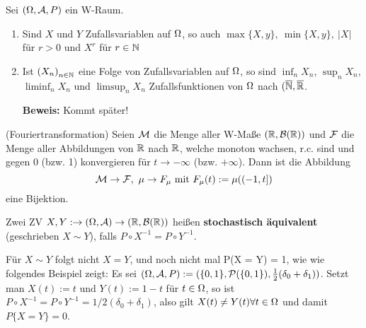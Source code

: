 \documentclass[parskip = full, 12pt]{scrartcl}
\begin{document}
\label{ss: Satz 4.3}
	Sei $(\Omega, \mathcal{A}, P)$ ein W-Raum.
	\begin{enumerate}
		\item Sind $X$ und $Y$ Zufallsvariablen auf $\Omega$, so auch $\max\{ X, y \},\
			\min\{ X, y \},\ |X|$ für $r > 0$ und $X^r$ für $r \in \mathbb{N}$	
		\item Ist ${(X_n)}_{n \in \mathbb{N}}$ eine Folge von Zufallsvariablen auf $\Omega$, 
			so sind $\inf_n X_n$, $\sup_n X_n$, $\liminf_n X_n$ und $\limsup_n X_n$ 
			Zufallsfunktionen von $ \Omega$ nach $(\overline{\mathbb{N}}, \overline{\mathbb{R}}$.

			\textbf{Beweis:} Kommt später!
	\end{enumerate}

\label{ss: Satz 4.4}
	(Fouriertransformation) Seien $\mathcal{M}$ die Menge aller W-Maße $(\mathbb{R}, \mathcal{B}(
	\mathbb{R}))$ und $\mathcal{F}$ die Menge aller Abbildungen von $\mathbb{R}$ nach $\mathbb{R}$,
	welche monoton wachsen, r.c. sind und gegen 0 (bzw. 1) konvergieren für $t 
	\rightarrow -\infty$ (bzw. $+ \infty$). Dann ist die Abbildung
	$$ \mathcal{M} \rightarrow \mathcal{F},\ \mu \rightarrow F_\mu \textrm{ mit } F_\mu(t) := 
	\mu( (-1,t])$$ eine Bijektion.

\label{ss: Defintion 4.5}
	Zwei ZV $X,Y: \rightarrow (\Omega, \mathcal{A}) \rightarrow (\mathbb{R}, \mathcal{B}(\mathbb{R}))$ heißen 
	\textbf{stochastisch äquivalent} (geschrieben $X \sim Y$), falls $P \circ 
	X^{-1} = P \circ Y^{-1}$.

\label{ss: Beispiel 4.6}
	Für $X \sim Y$ folgt nicht $X = Y$, und noch nicht mal P({X = Y}) = 1, wie 
	wie folgendes Beispiel zeigt: Es sei $(\Omega, \mathcal{A}, P) := (\{ 0,1 \}, \mathcal{P}(\{ 0,1
	\}), \frac{1}{2}(\delta_0 + \delta_1))$. Setzt man $X(t) := t$ und $Y(t) := 
	1 - t$ für $t \in \Omega$, so ist $P \circ X^{-1} = P \circ Y^{-1} = 1/2(\delta_0
	+ \delta_1)$, also gilt $X(t) \neq Y(t) \forall t \in \Omega$ und damit $P\{ X =
	Y \} = 0$.
\end{document}
